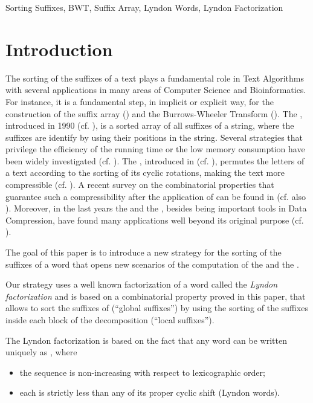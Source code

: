 \documentclass[envcountsame,runningheads]{llncs}
\begin{document}
\begin{keywords}
Sorting Suffixes, BWT, Suffix Array, Lyndon Words, Lyndon Factorization
\end{keywords}


\section{Introduction}


The sorting of the suffixes of a text plays a fundamental role in Text Algorithms with several applications in many areas of Computer Science and Bioinformatics.
For instance, it is a fundamental step, in implicit or explicit way, for the construction of the suffix array () and the Burrows-Wheeler Transform ().
The , introduced in 1990 (cf. \cite{Manber:1990}), is a sorted array of all suffixes of a string, where the suffixes are identify by using their positions in the string. Several strategies that privilege the efficiency of the running time or the low memory consumption have been widely investigated (cf. \cite{Puglisi:2007,GrossiSurvey2011}).
The , introduced in  (cf. \cite{bwt94}), permutes the letters of a text according to the sorting of its cyclic rotations, making the text more compressible (cf. \cite{bookBWTAdjeroh:2008}). A recent survey on the combinatorial properties that guarantee such a compressibility after the application of  can be found in \cite{RosoneSciortino_CiE2013} (cf. also \cite{RestivoRosoneTCS2011}).
Moreover, in the last years the  and the , besides being important tools in Data Compression, have found many applications well beyond its original purpose (cf. \cite{AbouelhodaKurtzOhlebusch2002,Ferragina:2000,FerraginaManzini2001,MantaciRRS08,Simpson2010,CoxJakobiRosoneST2012,bookBWTAdjeroh:2008}).

The goal of this paper is to introduce a new strategy for the sorting of the suffixes of a word that opens new scenarios of the computation of the  and the .

Our strategy uses a well known factorization of a word  called the \emph{Lyndon factorization} and is based on a combinatorial property proved in this paper, that allows to sort the suffixes of  (``global suffixes'') by using the sorting of the suffixes inside each block of the decomposition (``local suffixes'').


The Lyndon factorization is based on the fact that any word  can be written uniquely as , where
\begin{itemize}
  \item the sequence  is non-increasing with respect to lexicographic order;
  \item each  is strictly less than any of its proper cyclic shift (Lyndon words).
\end{itemize}
\end{document}
